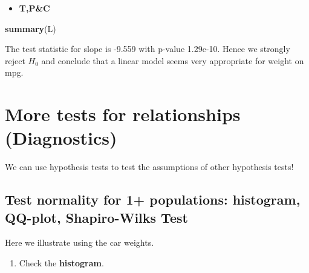 \documentclass[]{article}
\newenvironment{Shaded}{\begin{snugshade}}{\end{snugshade}}
\newcommand{\DataTypeTok}[1]{\textcolor[rgb]{0.13,0.29,0.53}{#1}}
\newcommand{\KeywordTok}[1]{\textcolor[rgb]{0.13,0.29,0.53}{\textbf{#1}}}
\newcommand{\NormalTok}[1]{#1}
\newcommand{\OperatorTok}[1]{\textcolor[rgb]{0.81,0.36,0.00}{\textbf{#1}}}
\newcommand{\StringTok}[1]{\textcolor[rgb]{0.31,0.60,0.02}{#1}}
\providecommand{\tightlist}{%
  \setlength{\itemsep}{0pt}\setlength{\parskip}{0pt}}
\begin{document}
\begin{Shaded}
\end{Shaded}

\begin{itemize}
\tightlist
\item
  \textbf{T,P\&C}
\end{itemize}

\begin{Shaded}
\begin{Highlighting}[]
\KeywordTok{summary}\NormalTok{(L)}
\end{Highlighting}
\end{Shaded}

The test statistic for slope is -9.559 with p-value 1.29e-10. Hence we strongly reject \(H_{0}\) and conclude that a linear model seems very appropriate for weight on mpg.

\hypertarget{morerelationships}{%
\section{More tests for relationships (Diagnostics)}\label{morerelationships}}

We can use hypothesis tests to test the assumptions of other hypothesis tests!

\hypertarget{test-normality-for-1-populations-histogram-qq-plot-shapiro-wilks-test}{%
\subsection{Test normality for 1+ populations: histogram, QQ-plot, Shapiro-Wilks Test}\label{test-normality-for-1-populations-histogram-qq-plot-shapiro-wilks-test}}

Here we illustrate using the car weights.

\begin{enumerate}
\def\labelenumi{(\arabic{enumi})}
\tightlist
\item
  Check the \textbf{histogram}.
\end{enumerate}

\begin{Shaded}
\end{Shaded}
\end{document}
